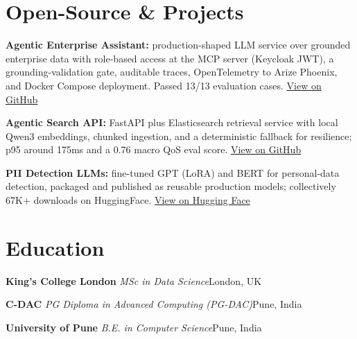 \documentclass[10pt,a4paper]{article}
\newcommand{\sep}{\,\textcolor{accent!60}{\textbar}\,}
\begin{document}
\section{Open-Source \& Projects}
\begin{tight}
  \item \textbf{Agentic Enterprise Assistant:} production-shaped LLM service over grounded enterprise data with role-based access at the MCP server (Keycloak JWT), a grounding-validation gate, auditable traces, OpenTelemetry to Arize Phoenix, and Docker Compose deployment. Passed 13/13 evaluation cases. \href{https://github.com/abhijeetscode/Agentic-Enterprise-Assistant}{View on GitHub}
  \item \textbf{Agentic Search API:} FastAPI plus Elasticsearch retrieval service with local Qwen3 embeddings, chunked ingestion, and a deterministic fallback for resilience; p95 around 175ms and a 0.76 macro QoS eval score. \href{https://github.com/abhijeetscode/search-agent}{View on GitHub}
  \item \textbf{PII Detection LLMs:} fine-tuned GPT (LoRA) and BERT for personal-data detection, packaged and published as reusable production models; collectively 67K+ downloads on HuggingFace. \href{https://huggingface.co/ab-ai/pii_model}{View on Hugging Face}
\end{tight}

\section{Education}
{\color{company}\bfseries King's College London}\sep{\itshape MSc in Data Science}\hfill {\color{muted}London, UK}\par\vspace{1pt}
{\color{company}\bfseries C-DAC}\sep{\itshape PG Diploma in Advanced Computing (PG-DAC)}\hfill {\color{muted}Pune, India}\par\vspace{1pt}
{\color{company}\bfseries University of Pune}\sep{\itshape B.E. in Computer Science}\hfill {\color{muted}Pune, India}\par
\end{document}
